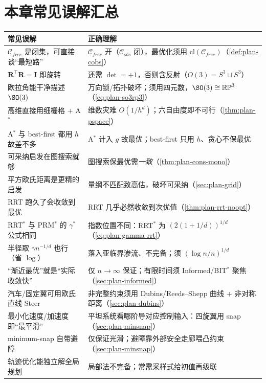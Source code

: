 \section*{本章常见误解汇总}
\begin{table}[H]\centering\small
\begin{tabular}{p{} p{}}
\toprule
\textbf{常见误解} & \textbf{正确理解} \\
\midrule
$\mathcal{C}_{free}$ 是闭集，可直接谈“最短路” & $\mathcal{C}_{free}$ 开（$\mathcal{C}_{obs}$ 闭），最优化须用 $\mathrm{cl}(\mathcal{C}_{free})$（\cref{def:plan-cobs}）\\
$\mathbf{R}^\top\mathbf{R}=\mathbf{I}$ 即旋转 & 还需 $\det=+1$，否则含反射（$O(3)=S^3\sqcup S^3$）\\
欧拉角能干净描述 $\SO(3)$ & 万向锁/拓扑破坏；须用四元数，$\SO(3)\cong\mathbb{RP}^3$（\cref{eq:plan-so3rp3}）\\
高维直接用细栅格 + A$^*$ & 维数灾难 $O(1/h^d)$；六自由度即不可行（\cref{thm:plan-pspace}）\\
A$^*$ 与 best-first 都用 $h$ 故差不多 & A$^*$ 计入 $g$ 故最优；best-first 只用 $h$、贪心不保最优 \\
可采纳启发在图搜索就够 & 图搜索保最优需\emph{一致}（\cref{thm:plan-cons-mono}）\\
平方欧氏距离是更精的启发 & 量纲不匹配致高估，破坏可采纳（\cref{sec:plan-grid}）\\
RRT 跑久了会收敛到最优 & RRT 几乎必然收敛到次优值（\cref{thm:plan-rrt-noopt}）\\
RRT$^*$ 与 PRM$^*$ 的 $\gamma^*$ 公式相同 & 指数位置不同：RRT$^*$ 为 $(2(1+1/d))^{1/d}$（\cref{eq:plan-gamma-rrt}）\\
半径取 $\gamma n^{-1/d}$ 也行（省 $\log$） & 落入亚临界渗流、不完备；须 $(\log n/n)^{1/d}$ \\
“渐近最优”就是“实际收敛快” & 仅 $n\to\infty$ 保证；有限时间须 Informed/BIT$^*$ 聚焦（\cref{sec:plan-informed}）\\
汽车/固定翼可用欧氏直线 Steer & 非完整约束须用 Dubins/Reeds--Shepp 曲线 + 非对称距离（\cref{sec:plan-dubins}）\\
最小化速度/加速度即“最平滑” & 平坦系统看哪阶导对应控制输入：四旋翼用 snap（\cref{sec:plan-minsnap}）\\
minimum-snap 自带避障 & 仅保证光滑；避障靠外部安全走廊喂凸约束（\cref{sec:plan-minsnap}）\\
轨迹优化能独立解全局规划 & 局部法不完备；常需采样式给初值再级联 \\
\bottomrule
\end{tabular}
\end{table}

